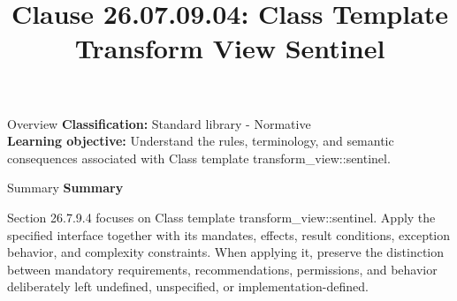 \documentclass[10pt,letterpaper]{article}
\title{Clause 26.07.09.04: Class Template Transform View Sentinel}
\author{}
\date{}
\begin{document}
\maketitle
\begin{CornellOverviewBox}{Overview}
\textbf{Classification:} Standard library - Normative\\[2pt]
\textbf{Learning objective:} Understand the rules, terminology, and semantic consequences associated with Class template transform\_view::sentinel.
\end{CornellOverviewBox}\begin{CornellSummaryBox}{Summary}
{\sffamily\bfseries\color{Accent} Summary}\par\vspace{3pt}Section 26.7.9.4 focuses on Class template transform\_view::sentinel. Apply the specified interface together with its mandates, effects, result conditions, exception behavior, and complexity constraints. When applying it, preserve the distinction between mandatory requirements, recommendations, permissions, and behavior deliberately left undefined, unspecified, or implementation-defined.
\end{CornellSummaryBox}
\end{document}
